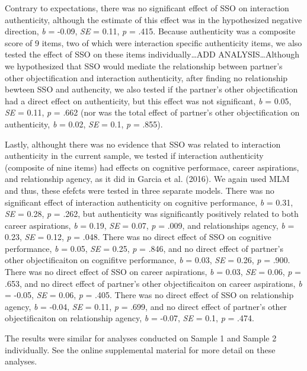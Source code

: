 \documentclass[man]{apa6}
\begin{document}
Contrary to expectations, there was no significant effect of SSO on
interaction authenticity, although the estimate of this effect was in
the hypothesized negative direction, \emph{b} = -0.09, \emph{SE} = 0.11,
\emph{p} = .415. Because authenticity was a composite score of 9 items,
two of which were interaction specific authenticity items, we also
tested the effect of SSO on these items individually\ldots{}ADD
ANALYSIS\ldots{}Although we hypothesized that SSO would mediate the
relationship between partner's other objectification and interaction
authenticity, after finding no relationship bewteen SSO and authencity,
we also tested if the partner's other objectification had a direct
effect on authenticity, but this effect was not significant, \emph{b} =
0.05, \emph{SE} = 0.11, \emph{p} = .662 (nor was the total effect of
partner's other objectification on authenticity, \emph{b} = 0.02,
\emph{SE} = 0.1, \emph{p} = .855).

Lastly, althought there was no evidence that SSO was related to
interaction authenticity in the current sample, we tested if interaction
authenticity (composite of nine items) had effects on cognitive
performace, career aspirations, and relationship agency, as it did in
Garcia et al. (2016). We again used MLM and thus, these efefcts were
tested in three separate models. There was no significant effect of
interaction authenticity on cognitive performance, \emph{b} = 0.31,
\emph{SE} = 0.28, \emph{p} = .262, but authenticity was significantly
positively related to both career aspirations, \emph{b} = 0.19,
\emph{SE} = 0.07, \emph{p} = .009, and relationships agency, \emph{b} =
0.23, \emph{SE} = 0.12, \emph{p} = .048. There was no direct effect of
SSO on cognitive performance, \emph{b} = 0.05, \emph{SE} = 0.25,
\emph{p} = .846, and no direct effect of partner's other objectificaiton
on cognifitve performance, \emph{b} = 0.03, \emph{SE} = 0.26, \emph{p} =
.900. There was no direct effect of SSO on career aspirations, \emph{b}
= 0.03, \emph{SE} = 0.06, \emph{p} = .653, and no direct effect of
partner's other objectificaiton on career aspirations, \emph{b} = -0.05,
\emph{SE} = 0.06, \emph{p} = .405. There was no direct effect of SSO on
relationship agency, \emph{b} = -0.04, \emph{SE} = 0.11, \emph{p} =
.699, and no direct effect of partner's other objectificaiton on
relationship agency, \emph{b} = -0.07, \emph{SE} = 0.1, \emph{p} = .474.

The results were similar for analyses conducted on Sample 1 and Sample 2
individually. See the online supplemental material for more detail on
these analyses.
\end{document}
